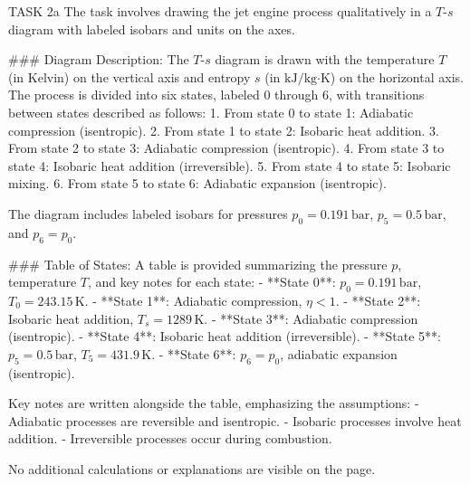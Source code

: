 TASK 2a  
The task involves drawing the jet engine process qualitatively in a \( T \)-\( s \) diagram with labeled isobars and units on the axes.  

### Diagram Description:  
The \( T \)-\( s \) diagram is drawn with the temperature \( T \) (in Kelvin) on the vertical axis and entropy \( s \) (in \( \text{kJ/kg·K} \)) on the horizontal axis. The process is divided into six states, labeled 0 through 6, with transitions between states described as follows:  
1. From state 0 to state 1: Adiabatic compression (isentropic).  
2. From state 1 to state 2: Isobaric heat addition.  
3. From state 2 to state 3: Adiabatic compression (isentropic).  
4. From state 3 to state 4: Isobaric heat addition (irreversible).  
5. From state 4 to state 5: Isobaric mixing.  
6. From state 5 to state 6: Adiabatic expansion (isentropic).  

The diagram includes labeled isobars for pressures \( p_0 = 0.191 \, \text{bar} \), \( p_5 = 0.5 \, \text{bar} \), and \( p_6 = p_0 \).  

### Table of States:  
A table is provided summarizing the pressure \( p \), temperature \( T \), and key notes for each state:  
- **State 0**: \( p_0 = 0.191 \, \text{bar} \), \( T_0 = 243.15 \, \text{K} \).  
- **State 1**: Adiabatic compression, \( \eta < 1 \).  
- **State 2**: Isobaric heat addition, \( T_s = 1289 \, \text{K} \).  
- **State 3**: Adiabatic compression (isentropic).  
- **State 4**: Isobaric heat addition (irreversible).  
- **State 5**: \( p_5 = 0.5 \, \text{bar} \), \( T_5 = 431.9 \, \text{K} \).  
- **State 6**: \( p_6 = p_0 \), adiabatic expansion (isentropic).  

Key notes are written alongside the table, emphasizing the assumptions:  
- Adiabatic processes are reversible and isentropic.  
- Isobaric processes involve heat addition.  
- Irreversible processes occur during combustion.  

No additional calculations or explanations are visible on the page.